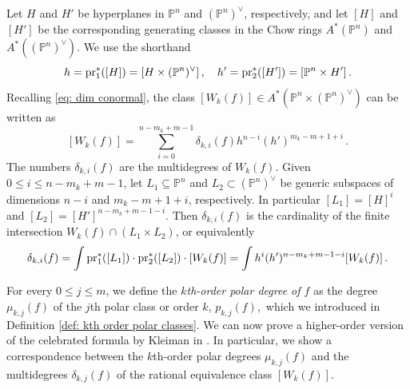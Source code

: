 \documentclass[11pt,reqno]{amsart}
\numberwithin{equation}{section}
\theoremstyle{plain}
\numberwithin{theorem}{section}
\theoremstyle{definition}
\renewcommand{\P}{\mathbb{P}}
\newcommand{\pr}{{\rm pr}}
\begin{document}
Let $H$ and $H'$ be hyperplanes in $\P^n$ and $(\P^n)^\vee$, respectively, and let $[H]$ and $[H']$ be the corresponding generating classes in the Chow rings $A^*(\P^n)$ and $A^*((\P^n)^\vee)$. We use the shorthand
\begin{equation}\label{eq: notation hyperplane classes}
h=\pr_1^*([H])=[H\times(\P^n)^\vee]\,,\quad h'=\pr_2^*([H'])=[\P^n\times H']\,.
\end{equation}
Recalling \eqref{eq: dim conormal}, the class $[W_k(f)]\in A^*(\P^n\times(\P^n)^\vee)$ can be written as
\begin{equation}\label{eq: def multidegrees conormal}
[W_k(f)] =  \sum_{i=0}^{n-m_k+m-1}\delta_{k,i}(f)h^{n-i}(h')^{m_k-m+1+i}\,.
\end{equation}
The numbers $\delta_{k,i}(f)$ are the multidegrees of $W_k(f)$.
Given $0\le i\le n-m_k+m-1$, let $L_1\subseteq\P^n$ and $L_2\subset(\P^n)^\vee$ be generic subspaces of dimensions $n-i$ and $m_k-m+1+i$, respectively. In particular $[L_1]=[H]^i$ and $[L_2]=[H']^{n-m_k+m-1-i}$. Then $\delta_{k,i}(f)$ is the cardinality of the finite intersection $W_k(f)\cap(L_1\times L_2)$, or equivalently
\begin{equation}\label{eq: interpretation multidegrees delta_i}
    \delta_{k,i}(f)=\int \pr_1^*([L_1])\cdot \pr_2^*([L_2])\cdot[W_k(f)]=\int h^i(h')^{n-m_k+m-1-i}[W_k(f)]\,.
\end{equation}

For every $0\le j\le m$, we define the {\em $k$th-order polar degree of $f$} as the degree $\mu_{k,j}(f)$ of the $j$th polar class or order $k$, $p_{k,j}(f),$ which we introduced in Definition \ref{def: kth order polar classes}.
We can now prove a higher-order version of the celebrated formula by Kleiman in \cite[Prop. (3), p. 187]{kleiman1986tangency}. In particular, we show a correspondence between the $k$th-order polar degrees $\mu_{k,j}(f)$ and the multidegrees $\delta_{k,j}(f)$ of the rational equivalence class $[W_k(f)]$. 
\end{document}
